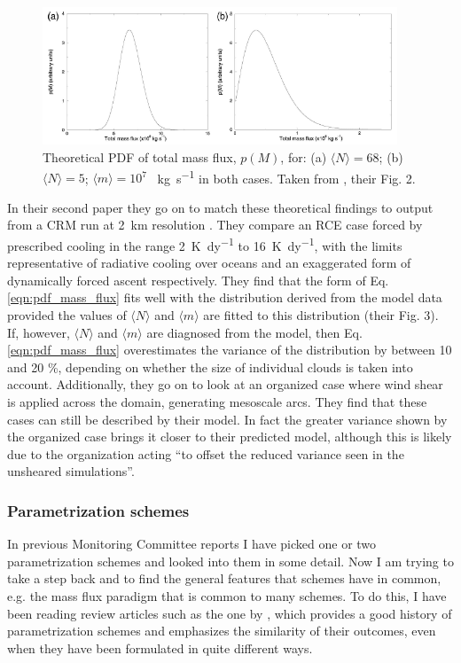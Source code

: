 \documentclass[11pt,a4paper]{article}
\begin{document}
\begin{figure}[hbp!]
    \centering
    \includegraphics[width=400px]{figures/CraigAndCohenFig2}
    \caption{Theoretical PDF of total mass flux, $p(M)$, for: (a) $\langle N \rangle = 68$; (b) $\langle N \rangle = 5$; $\langle m \rangle = 10^7$ \SI{}{kg.s^{-1}} in both cases. Taken from \cite{craig2006fluctuations}, their Fig. 2.}
    \label{fig:pdf_mass_flux}
\end{figure}

In their second paper they go on to match these theoretical findings to output from a CRM run at \SI{2}{km} resolution \parencite{cohen2006fluctuations}. They compare an RCE case forced by prescribed cooling in the range \SI{2}{K.dy^{-1}} to \SI{16}{K.dy^{-1}}, with the limits representative of radiative cooling over oceans and an exaggerated form of dynamically forced ascent respectively. They find that the form of Eq. \ref{eqn:pdf_mass_flux} fits well with the distribution derived from the model data provided the values of $\langle N \rangle$ and $\langle m \rangle$ are fitted to this distribution (their Fig. 3). If, however, $\langle N \rangle$ and $\langle m \rangle$  are diagnosed from the model, then Eq. \ref{eqn:pdf_mass_flux} overestimates the variance of the distribution by between 10 and 20 \%, depending on whether the size of individual clouds is taken into account. Additionally, they go on to look at an organized case where wind shear is applied across the domain, generating mesoscale arcs. They find that these cases can still be described by their model. In fact the greater variance shown by the organized case brings it closer to their predicted model, although this is likely due to the organization acting ``to offset the reduced variance seen in the unsheared simulations''.


\subsubsection{Parametrization schemes}
In previous Monitoring Committee reports I have picked one or two parametrization schemes and looked into them in some detail. Now I am trying to take a step back and to find the general features that schemes have in common, e.g. the mass flux paradigm that is common to many schemes. To do this, I have been reading review articles such as the one by \cite{arakawa2004cumulus}, which provides a good history of parametrization schemes and emphasizes the similarity of their outcomes, even when they have been formulated in quite different ways. 
\end{document}
